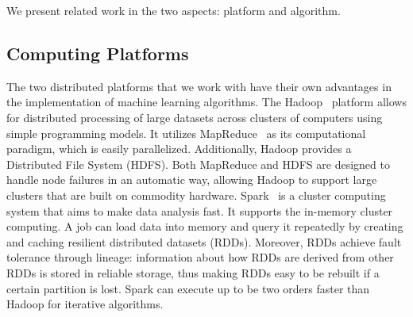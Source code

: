 \documentclass[10pt, conference, compsocconf]{IEEEtran}
\def\etal{{\em et al.\/}\,}
\begin{document}
%

We present related work in the two aspects: platform and algorithm.
\subsection{Computing Platforms}\label{sec:platform}
The two distributed platforms that we work with have their
own advantages in the implementation of machine learning algorithms.
The Hadoop~\cite{white2012hadoop} platform allows for distributed processing of large datasets across clusters of computers using simple programming models. It utilizes MapReduce~\cite{dean2008mapreduce} as its computational paradigm, which is easily parallelized. Additionally, Hadoop provides a Distributed File System (HDFS). Both MapReduce and HDFS are designed to handle node failures in an automatic way, allowing Hadoop to support large clusters that are built on commodity hardware.
Spark~\cite{zaharia2010spark} is a cluster computing system that aims to make data analysis fast. It supports the in-memory cluster computing. A job can load data into memory and query it repeatedly by creating and caching resilient distributed datasets (RDDs). Moreover, RDDs achieve fault tolerance through lineage: information about how RDDs are derived from other RDDs is stored in reliable storage, thus making RDDs easy to be rebuilt if a certain partition is lost. Spark can execute up to be two orders faster than Hadoop for iterative algorithms.
\end{document}
